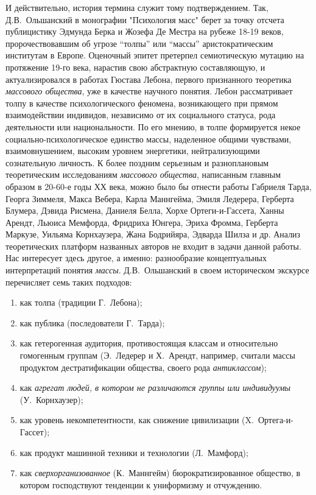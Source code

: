 И действительно, история термина служит тому подтверждением.
Так, Д.В.~Ольшанский в монографии "Психология масс" берет за точку отсчета
публицистику Эдмунда Берка и Жозефа Де Местра на рубеже 18-19 веков,
пророчествовавшим об угрозе ``толпы'' или ``массы'' аристократическим институтам
в Европе. Оценочный эпитет претерпел семиотическую мутацию на протяжение 19-го века,
нарастив свою абстрактную составляющую, и актуализировался в работах Гюстава Лебона,
первого признанного теоретика \emph{массового общества}, уже в качестве научного понятия.
Лебон рассматривает толпу в качестве психологического феномена, возникающего при прямом
взаимодействии индивидов, независимо от их социального статуса, рода деятельности или
национальности. По его мнению, в толпе формируется некое социально-психологическое
единство массы, наделенное общими чувствами, взаимовнушением, высоким уровнем энергетики,
нейтрализующими сознательную личность. К более поздним серьезным и разноплановым
теоретическим исследованиям \emph{массового общества}, написанным главным образом в
20-60-е годы ХХ века, можно было бы отнести работы Габриеля Тарда, Георга Зиммеля,
Макса Вебера, Карла Маннгейма, Эмиля Ледерера, Герберта Блумера, Дэвида Рисмена,
Даниеля Белла, Хорхе Ортеги-и-Гассета, Ханны Арендт, Льюиса Мемфорда, Фридриха Юнгера,
Эриха Фромма, Герберта Маркузе, Уильяма Корнхаузера, Жана Бодрийяра, Эдварда Шилза и др.
Анализ теоретических платформ названных авторов не входит в задачи данной работы.
Нас интересует здесь другое, а именно: разнообразие концептуальных интерпретаций
понятия \emph{массы}.
Д.В.~Ольшанский в своем историческом экскурсе\autocite{book:olshansky}
перечисляет семь таких подходов:
\begin{enumerate}[label={\arabic*)}]
    \item как толпа (традиции Г.~Лебона);
    \item как публика (последователи Г.~Тарда);
    \item как гетерогенная аудитория, противостоящая классам и относительно гомогенным
    группам (Э.~Ледерер и Х.~Арендт, например, считали массы продуктом дестратификации
    общества, своего рода \emph{антиклассом});
    \item как \emph{агрегат людей, в котором не различаются группы или индивидуумы} (У.~Корнхаузер);
    \item как уровень некомпетентности, как снижение цивилизации (X.~Ортега-и-Гассет);
    \item как продукт машинной техники и технологии (Л.~Мамфорд);
    \item как \emph{сверхорганизованное} (К.~Маннгейм) бюрократизированное общество,
    в котором господствуют тенденции к униформизму и отчуждению.
\end{enumerate}

